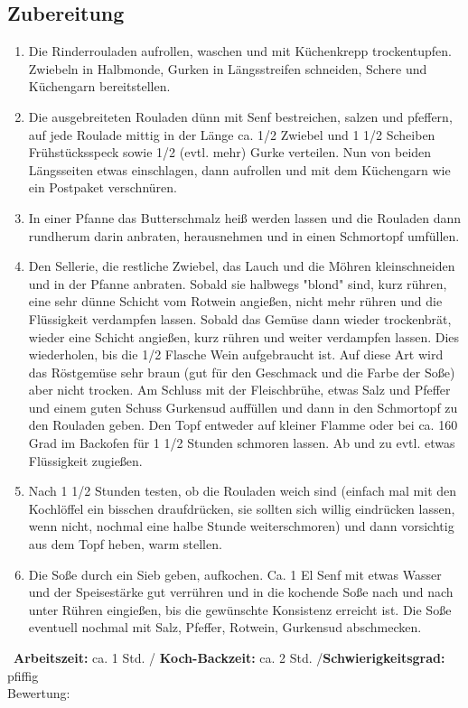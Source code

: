 \hfill
\begin{minipage}[t]{0.58\textwidth}
\vspace{0pt}
\subsection*{Zubereitung}
\begin{enumerate}[leftmargin=*, itemindent=14pt]
\item Die Rinderrouladen aufrollen, waschen und mit Küchenkrepp trockentupfen. Zwiebeln in Halbmonde, Gurken in Längsstreifen schneiden, Schere und Küchengarn bereitstellen. 

\item Die ausgebreiteten Rouladen dünn mit Senf bestreichen, salzen und pfeffern, auf jede Roulade mittig in der Länge ca. 1/2 Zwiebel und 1 1/2 Scheiben Frühstücksspeck sowie 1/2 (evtl. mehr) Gurke verteilen. Nun von beiden Längsseiten etwas einschlagen, dann aufrollen und mit dem Küchengarn wie ein Postpaket verschnüren.

\item In einer Pfanne das Butterschmalz heiß werden lassen und die Rouladen dann rundherum darin anbraten, herausnehmen und in einen Schmortopf umfüllen.

\item Den Sellerie, die restliche Zwiebel, das Lauch und die Möhren kleinschneiden und in der Pfanne anbraten. Sobald sie halbwegs "blond" sind, kurz rühren, eine sehr dünne Schicht vom Rotwein angießen, nicht mehr rühren und die Flüssigkeit verdampfen lassen. Sobald das Gemüse dann wieder trockenbrät, wieder eine Schicht angießen, kurz rühren und weiter verdampfen lassen. Dies wiederholen, bis die 1/2 Flasche Wein aufgebraucht ist. Auf diese Art wird das Röstgemüse sehr braun (gut für den Geschmack und die Farbe der Soße) aber nicht trocken. Am Schluss mit der Fleischbrühe, etwas Salz und Pfeffer und einem guten Schuss Gurkensud auffüllen und dann in den Schmortopf zu den Rouladen geben. Den Topf entweder auf kleiner Flamme oder bei ca. 160 Grad im Backofen für 1 1/2 Stunden schmoren lassen. Ab und zu evtl. etwas Flüssigkeit zugießen.

\item Nach 1 1/2 Stunden testen, ob die Rouladen weich sind (einfach mal mit den Kochlöffel ein bisschen draufdrücken, sie sollten sich willig eindrücken lassen, wenn nicht, nochmal eine halbe Stunde weiterschmoren) und dann vorsichtig aus dem Topf heben, warm stellen.

\item Die Soße durch ein Sieb geben, aufkochen. Ca. 1 El Senf mit etwas Wasser und der Speisestärke gut verrühren und in die kochende Soße nach und nach unter Rühren eingießen, bis die gewünschte Konsistenz erreicht ist. Die Soße eventuell nochmal mit Salz, Pfeffer, Rotwein, Gurkensud abschmecken. 

\end{enumerate}
\end{minipage}
\vfill
\decothreeright \, \textbf{Arbeitszeit:} ca. 1 Std. / \textbf{Koch-Backzeit:} ca. 2 Std. /\textbf{Schwierigkeitsgrad:} pfiffig \decothreeleft \hfill \\ Bewertung:  \Circle  \Circle \Circle \Circle \Circle
